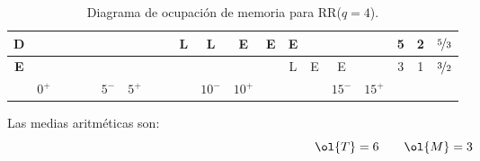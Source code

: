 \begin{ejercicio}
\begin{enumerate}
\begin{table}[H]
\begin{tabular}{ccccccccccccccccc|ccc}
            \multicolumn{1}{c|}{\textbf{D}} &                        &                                &                                &                                &                        &                        &                                &                                & L                              & L                       & E                       & E                              & E                              &                                &                         &    & 5          & 2          & $\nicefrac{5}{3}$       \\ \hline
            \multicolumn{1}{c|}{\textbf{E}} &                        &                                &                                &                                &                        &                        &                                &                                &                                &                         &                         &                                & L                              & E                              & E                       &    & 3          & 1          & $\nicefrac{3}{2}$        \\ \hline
            \multicolumn{1}{c|}{}           & \multicolumn{1}{c|}{$0^+$} & \multicolumn{1}{c|}{\textit{}} & \multicolumn{1}{c|}{\textit{}} & \multicolumn{1}{c|}{\textit{}} & \multicolumn{1}{c|}{$5^-$} & \multicolumn{1}{c|}{$5^+$} & \multicolumn{1}{c|}{\textit{}} & \multicolumn{1}{c|}{\textit{}} & \multicolumn{1}{c|}{\textit{}} & \multicolumn{1}{c|}{$10^-$} & \multicolumn{1}{c|}{$10^+$} & \multicolumn{1}{c|}{\textit{}} & \multicolumn{1}{c|}{\textit{}} & \multicolumn{1}{c|}{\textit{}} & \multicolumn{1}{c|}{$15^-$} & $15^+$ &            &            &           
            \end{tabular}
            \caption{Diagrama de ocupación de memoria para RR($q=4$).}
        \end{table}

        Las medias aritméticas son:
        \begin{equation*}
            \ol{T} = 6 \qquad \ol{M}=3
        \end{equation*}
    \end{enumerate}
\end{ejercicio}


